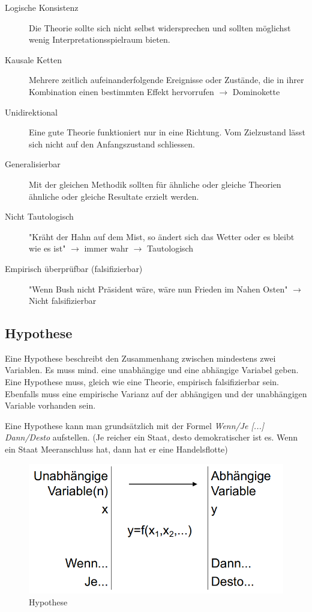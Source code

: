 \documentclass[a4paper, 11pt]{article}
\begin{document}
\begin{description}
	\item [Logische Konsistenz] Die Theorie sollte sich nicht selbst widersprechen und sollten möglichst wenig Interpretationsspielraum bieten.
	\item [Kausale Ketten] Mehrere zeitlich aufeinanderfolgende Ereignisse oder Zustände, die in ihrer Kombination einen bestimmten Effekt hervorrufen $\rightarrow$  Dominokette
	\item [Unidirektional] Eine gute Theorie funktioniert nur in eine Richtung. Vom Zielzustand lässt sich nicht auf den Anfangszustand schliessen.
	\item [Generalisierbar] Mit der gleichen Methodik sollten für ähnliche oder gleiche Theorien ähnliche oder gleiche Resultate erzielt werden.
	\item [Nicht Tautologisch] "Kräht der Hahn auf dem Mist, so ändert sich das Wetter oder es bleibt wie es ist" $\rightarrow$ immer wahr $\rightarrow$ Tautologisch
	\item [Empirisch überprüfbar (falsifizierbar)] "Wenn Bush nicht Präsident wäre, wäre nun Frieden im Nahen Osten" $\rightarrow$  Nicht falsifizierbar
\end{description}

\subsection{Hypothese}

Eine Hypothese beschreibt den Zusammenhang zwischen mindestens zwei Variablen. Es muss mind. eine unabhängige und eine abhängige Variabel geben. Eine Hypothese muss, gleich wie eine Theorie, empirisch falsifizierbar sein. Ebenfalls muss eine empirische Varianz auf der abhängigen und der unabhängigen Variable vorhanden sein.

Eine Hypothese kann man grundsätzlich mit der Formel \textit{Wenn/Je [...] Dann/Desto} aufstellen. (Je reicher ein Staat, desto demokratischer ist es. Wenn ein Staat Meeranschluss hat, dann hat er eine Handelsflotte)

\begin{figure}
	\centering
	\includegraphics[keepaspectratio=true,height=7.5\baselineskip]{Hypothese.png}
	\caption{Hypothese}
	\label{fig:hypothese}
\end{figure}
\end{document}
